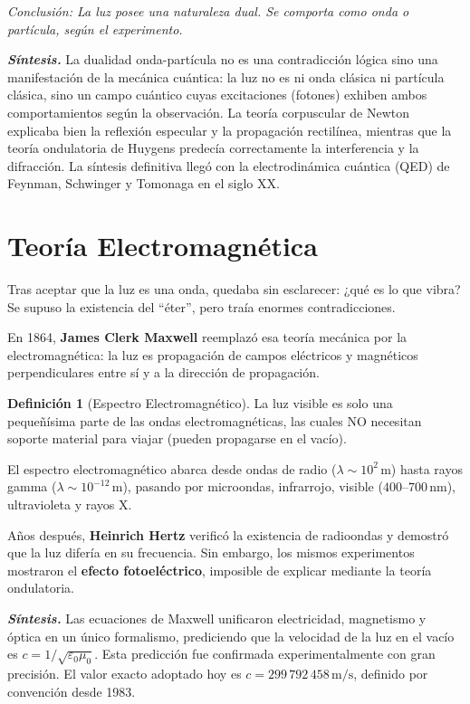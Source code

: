 \documentclass[12pt, a4paper]{article}
\theoremstyle{definition}
\newtheorem{definicion}{Definición}[section]
\newcommand{\nota}[1]{\medskip\noindent\colorbox{grisclaro}{\parbox{0.95\linewidth}{\textit{#1}}}\medskip}
\begin{document}
\nota{Conclusión: La luz posee una naturaleza dual. Se comporta como onda o partícula,
según el experimento.}

\textit{\textbf{Síntesis.}} La dualidad onda-partícula no es una contradicción lógica sino
una manifestación de la mecánica cuántica: la luz no es ni onda clásica ni partícula clásica,
sino un campo cuántico cuyas excitaciones (fotones) exhiben ambos comportamientos según la
observación. La teoría corpuscular de Newton explicaba bien la reflexión especular y la
propagación rectilínea, mientras que la teoría ondulatoria de Huygens predecía correctamente
la interferencia y la difracción. La síntesis definitiva llegó con la electrodinámica cuántica
(QED) de Feynman, Schwinger y Tomonaga en el siglo XX.

\section{Teoría Electromagnética}
\label{sec:teoria_em}

Tras aceptar que la luz es una onda, quedaba sin esclarecer: ¿qué es lo que vibra? Se supuso
la existencia del ``éter'', pero traía enormes contradicciones.

En 1864, \textbf{James Clerk Maxwell} reemplazó esa teoría mecánica por la electromagnética:
la luz es propagación de campos eléctricos y magnéticos perpendiculares entre sí y a la
dirección de propagación.

\begin{definicion}[Espectro Electromagnético]
La luz visible es solo una pequeñísima parte de las ondas electromagnéticas, las cuales NO
necesitan soporte material para viajar (pueden propagarse en el vacío).
\end{definicion}

El espectro electromagnético abarca desde ondas de radio (\(\lambda \sim 10^2\,\text{m}\))
hasta rayos gamma (\(\lambda \sim 10^{-12}\,\text{m}\)), pasando por microondas, infrarrojo,
visible (\(400\text{--}700\,\text{nm}\)), ultravioleta y rayos X.

Años después, \textbf{Heinrich Hertz} verificó la existencia de radioondas y demostró que la
luz difería en su frecuencia. Sin embargo, los mismos experimentos mostraron el
\textbf{efecto fotoeléctrico}, imposible de explicar mediante la teoría ondulatoria.

\textit{\textbf{Síntesis.}} Las ecuaciones de Maxwell unificaron electricidad, magnetismo y
óptica en un único formalismo, prediciendo que la velocidad de la luz en el vacío es
\(c = 1/\sqrt{\varepsilon_0 \mu_0}\). Esta predicción fue confirmada experimentalmente con
gran precisión. El valor exacto adoptado hoy es \(c = 299\,792\,458\,\text{m/s}\), definido
por convención desde 1983.
\end{document}
